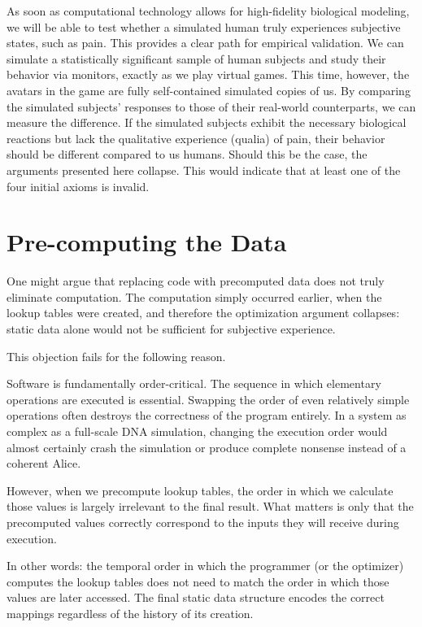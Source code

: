 As soon as computational technology allows for high-fidelity biological modeling, we will be able to test whether a simulated human truly experiences subjective states, such as pain.
This provides a clear path for empirical validation.
We can simulate a statistically significant sample of human subjects and study their behavior via monitors, exactly as we play virtual games.
This time, however, the avatars in the game are fully self-contained simulated copies of us.
By comparing the simulated subjects' responses to those of their real-world counterparts, we can measure the difference.
If the simulated subjects exhibit the necessary biological reactions but lack the qualitative experience (qualia) of pain, their behavior should be different compared to us humans.
Should this be the case, the arguments presented here collapse. This would indicate that at least one of the four initial axioms is invalid.



\section{Pre-computing the Data}

One might argue that replacing code with precomputed data does not truly eliminate computation. The computation simply occurred earlier, when the lookup tables were created, and therefore the optimization argument collapses: static data alone would not be sufficient for subjective experience.

This objection fails for the following reason.

Software is fundamentally order-critical. The sequence in which elementary operations are executed is essential.
Swapping the order of even relatively simple operations often destroys the correctness of the program entirely.
In a system as complex as a full-scale DNA simulation, changing the execution order would almost certainly crash the simulation or produce complete nonsense instead of a coherent Alice.

However, when we precompute lookup tables, the order in which we calculate those values is largely irrelevant to the final result.
What matters is only that the precomputed values correctly correspond to the inputs they will receive during execution. 

In other words: the temporal order in which the programmer (or the optimizer) computes the lookup tables does not need to match the order in which those values are later accessed.
The final static data structure encodes the correct mappings regardless of the history of its creation.

